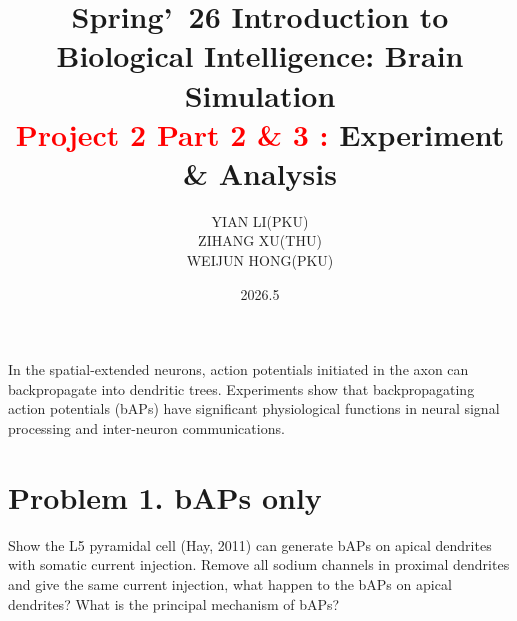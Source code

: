 \documentclass{article}
\title{\textbf{Spring'\ 26 \; Introduction to Biological Intelligence: Brain Simulation\\ \textcolor{red}{Project 2 Part 2 \& 3 :} Experiment \& Analysis}}
\author{YIAN LI(PKU) \\
ZIHANG XU(THU) \\
WEIJUN HONG(PKU) }
\date{2026.5}
\begin{document}
\pagestyle{plain}
\maketitle

\vspace{-3.5em}
\clearpage

In the spatial-extended neurons, action potentials initiated in the axon can backpropagate into dendritic trees. Experiments show that backpropagating action potentials (bAPs) have significant physiological functions in neural signal processing and inter-neuron communications.

\section*{\textbf{Problem 1.} bAPs only}

Show the L5 pyramidal cell (Hay, 2011) can generate bAPs on apical dendrites with somatic current injection. Remove all sodium channels in proximal dendrites and give the same current injection, what happen to the bAPs on apical dendrites? What is the principal mechanism of bAPs?
\end{document}
